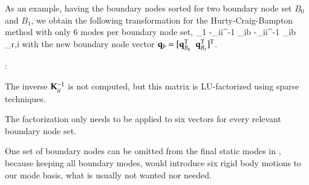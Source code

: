As an example, having the boundary nodes sorted for two boundary node set $B_0$ and $B_1$, we obtain the following transformation for the Hurty-Craig-Bampton method with only 6 modes per boundary node set,
\be \label{theory:eigenmodes:HCBRBE2}
   \approx {} {\Null}{\Tm_1}{\Null} 
                            {-\Km_{ii}^{-1} \Km_{ib} }{-\Km_{ii}^{-1} \Km_{ib} }{\tPsi_{r,i}}   
   \eqDot
\ee
with the new boundary node vector $\mathbf{q}_b = [\mathbf{q}_{B_0}^\mathrm{T} \;\; \mathbf{q}_{B_1}^\mathrm{T}]^\mathrm{T}$.

\noindent {}:
\bi
  \item The inverse $\mathbf{K}_{ii}^{-1} $ is not computed, but this matrix is LU-factorized using sparse techniques.
  \item The factorization only needs to be applied to six vectors for every relevant boundary node set.
  \item One set of boundary nodes can be omitted from the final static modes in , because keeping all boundary modes, would introduce six rigid body motions to our mode basis, what is usually not wanted nor needed.
\ei

